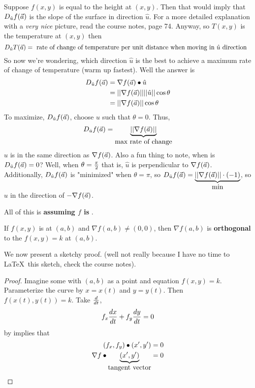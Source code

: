 \documentclass[english, 11pt]{article}
\begin{document}
\begin{exmp}
  Suppose $f(x,y)$ is equal to the height at $(x,y)$. Then that would imply that $D_{\hat{u}}f(\vec{a})$ is the slope of the surface in direction $\hat{u}$. For a more detailed explanation with a \textit{very nice} picture, read the course notes, page 74. Anyway, so $T(x,y)$ is the temperature at $(x,y)$ then
  \[ D_{\hat{u}}T(\vec{a}) = \mbox{\ rate of change of temperature per unit distance when moving in $\hat{u}$ direction \ } \]
  So now we're wondering, which direction $\hat{u}$ is the best to achieve a maximum rate of change of temperature (warm up fastest). Well the answer is
  \begin{align*}
    D_{\hat{u}}f(\vec{a}) & = \nabla f(\vec{a}) \bullet \hat{u} \\
    & = ||\nabla f(\vec{a})||||\hat{u}||\cos \theta \\
    & = ||\nabla f(\vec{a})||\cos \theta
  \end{align*}
  To maximize, $D_{\hat{u}}f(\vec{a})$, choose $\hat{u}$ such that $\theta = 0$. Thus,
  \[ D_{\hat{u}}f(\vec{a}) = \underbrace{||\nabla f(\vec{a})||}_{\mbox{max rate of change}} \]
  $\hat{u}$ is in the same direction as $\nabla f(\vec{a})$. Also a fun thing to note, when is $D_{\hat{u}}f(\vec{a}) = 0$? Well, when $\theta = \frac{\pi}{2}$ that is, $\hat{u}$ is perpendicular to $\nabla f(\vec{a})$. Additionally, $D_{\hat{u}} f(\vec{a})$ is "minimized" when $\theta = \pi$, so $D_{\hat{u}} f(\vec{a}) = \underbrace{||\nabla f(\vec{a})||\cdot(-1)}_{\mbox{min}}$, so $\hat{u}$ in the direction of $-\nabla f(\vec{a})$.

  \begin{note}
    All of this is \textbf{assuming $f$ is }.
  \end{note}
\end{exmp}

\begin{thrm}
  If $f(x,y)$ is  at $(a,b)$ and $\nabla f(a,b) \not = (0,0)$, then $\nabla f(a,b)$ is \textbf{orthogonal} to the  $f(x,y) = k$ at $(a,b)$.
\end{thrm}

We now present a sketchy proof. (well not really because I have no time to \LaTeX \ this sketch, check the course notes).

\begin{proof}
  Imagine some  with $(a,b)$ as a point and equation $f(x,y) = k$. Parameterize the curve by $x = x(t)$ and $y = y(t)$. Then $f(x(t), y(t)) = k$. Take $\frac{d}{dt}$,
  \[ f_x \frac{dx}{dt} + f_y\frac{dy}{dt} = 0 \]
  by  implies that
  \begin{align*}
    (f_x, f_y) \bullet (x', y') & = 0 \\
    \nabla f \bullet \underbrace{(x', y')}_{\mbox{tangent vector}} & = 0
  \end{align*}
\end{proof}
\end{document}
